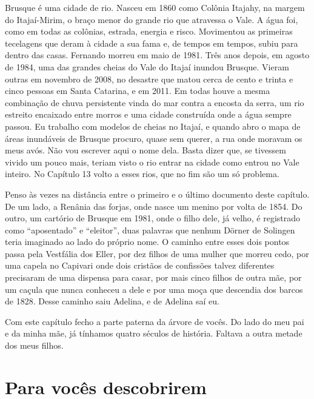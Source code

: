 \documentclass[
  brazilian,
  11pt,
  openany]{book}
\begin{document}
Brusque é uma cidade de rio. Nasceu em 1860 como Colônia Itajahy, na
margem do Itajaí-Mirim, o braço menor do grande rio que atravessa o
Vale. A água foi, como em todas as colônias, estrada, energia e risco.
Movimentou as primeiras tecelagens que deram à cidade a sua fama e, de
tempos em tempos, subiu para dentro das casas. Fernando morreu em maio
de 1981. Três anos depois, em agosto de 1984, uma das grandes cheias do
Vale do Itajaí inundou Brusque. Vieram outras em novembro de 2008, no
desastre que matou cerca de cento e trinta e cinco pessoas em Santa
Catarina, e em 2011. Em todas houve a mesma combinação de chuva
persistente vinda do mar contra a encosta da serra, um rio estreito
encaixado entre morros e uma cidade construída onde a água sempre
passou. Eu trabalho com modelos de cheias no Itajaí, e quando abro o
mapa de áreas inundáveis de Brusque procuro, quase sem querer, a rua
onde moravam os meus avós. Não vou escrever aqui o nome dela. Basta
dizer que, se tivessem vivido um pouco mais, teriam visto o rio entrar
na cidade como entrou no Vale inteiro. No Capítulo 13 volto a esses
rios, que no fim são um só problema.

Penso às vezes na distância entre o primeiro e o último documento deste
capítulo. De um lado, a Renânia das forjas, onde nasce um menino por
volta de 1854. Do outro, um cartório de Brusque em 1981, onde o filho
dele, já velho, é registrado como ``aposentado'' e ``eleitor'', duas
palavras que nenhum Dörner de Solingen teria imaginado ao lado do
próprio nome. O caminho entre esses dois pontos passa pela Vestfália dos
Eller, por dez filhos de uma mulher que morreu cedo, por uma capela no
Capivari onde dois cristãos de confissões talvez diferentes precisaram
de uma dispensa para casar, por mais cinco filhos de outra mãe, por um
caçula que nunca conheceu a dele e por uma moça que descendia dos barcos
de 1828. Desse caminho saiu Adelina, e de Adelina saí eu.

Com este capítulo fecho a parte paterna da árvore de vocês. Do lado do
meu pai e da minha mãe, já tínhamos quatro séculos de história. Faltava
a outra metade dos meus filhos.

\section{Para vocês descobrirem}\label{para-vocuxeas-descobrirem-9}
\end{document}
